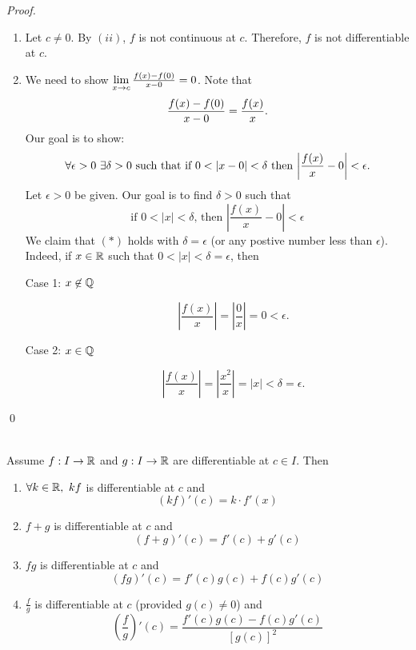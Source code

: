 \begin{proof}
\begin{enumerate}[$(i)$]
        \item Let $c \not = 0$. By $(ii)$, $f$ is not continuous at $c$. Therefore, $f$ is not differentiable at $c$.
        
        \item We need to show $\lim \limits_{x \to c} \frac{f(x) - f(0)}{x-0} = 0$. Note that
        $$\frac{f(x) - f(0)}{x - 0} = \frac{f(x)}{x}.$$
        Our goal is to show:
        $$\forall \epsilon > 0 ~\exists \delta > 0 \text{ such that } \text{if $0 < |x-0| <\delta$ then $\left|\frac{f(x)}{x} - 0\right| < \epsilon$}.$$
        Let $\epsilon > 0$ be given. Our goal is to find $\delta > 0$ such that
        \begin{equation*}
            \text{if $0 < |x| < \delta$, then $\left|\frac{f(x)}{x}- 0\right| < \epsilon$} \tag{$*$}
        \end{equation*}
        We claim that $(*)$ holds with $\delta = \epsilon$ (or any postive number less than $\epsilon$). Indeed, if $x \in \mathbb{R}$ such that $0 < |x| < \delta = \epsilon$, then
        \begin{description}
            \item[Case 1: $x \not \in \mathbb{Q}$]
            $$\left|\frac{f(x)}{x}\right| = \left|\frac{0}{x}\right| = 0 < \epsilon.$$
            \item[Case 2: $x \in \mathbb{Q}$]
            $$\left|\frac{f(x)}{x}\right| = \left|\frac{x^2}{x}\right| = |x| < \delta = \epsilon.$$
        \end{description}
    \end{enumerate}
    \qed
\end{proof}

\begin{theorem} \leavevmode \\
    Assume $f: I \to \mathbb{R}$ and $g: I \to \mathbb{R}$ are differentiable at $c \in I$. Then
    \begin{enumerate}[$(i)$]
        \item $\forall k \in \mathbb{R}, ~kf$ is differentiable at $c$ and
        $$(kf)'(c) = k \cdot f'(x)$$
        \item $f+g$ is differentiable at $c$ and 
        $$(f+g)'(c) = f'(c) + g'(c)$$
        \item $fg$ is differentiable at $c$ and 
        $$(fg)'(c) = f'(c)g(c) + f(c)g'(c)$$
        \item  $\frac{f}{g}$ is differentiable at $c$ (provided $g(c) \not = 0$) and 
        $$\left(\frac{f}{g}\right)'(c) = \frac{f'(c)g(c)-f(c)g'(c)}{[g(c)]^2}$$
    \end{enumerate}
\end{theorem}

